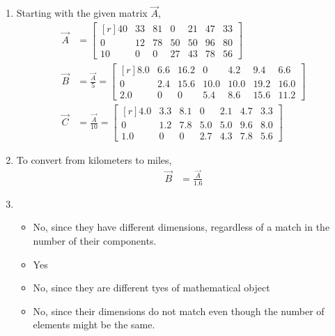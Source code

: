\begin{enumerate}
    \item Starting with the given matrix $ \vec{A} $,
          \begin{align}
              \vec{A} & =
              \begin{bmatrix*}[r]
                  40 & 33 & 81 & 0  & 21 & 47 & 33 \\
                  0  & 12 & 78 & 50 & 50 & 96 & 80 \\
                  10 & 0  & 0  & 27 & 43 & 78 & 56
              \end{bmatrix*}             \\
              \vec{B} & = \frac{\vec{A}}{5} =
              \begin{bmatrix*}[r]
                  8.0 & 6.6 & 16.2 & 0    & 4.2  & 9.4  & 6.6  \\
                  0   & 2.4 & 15.6 & 10.0 & 10.0 & 19.2 & 16.0 \\
                  2.0 & 0   & 0    & 5.4  & 8.6  & 15.6 & 11.2
              \end{bmatrix*} \\
              \vec{C} & = \frac{\vec{A}}{10} =
              \begin{bmatrix*}[r]
                  4.0 & 3.3 & 8.1 & 0   & 2.1 & 4.7 & 3.3 \\
                  0   & 1.2 & 7.8 & 5.0 & 5.0 & 9.6 & 8.0 \\
                  1.0 & 0   & 0   & 2.7 & 4.3 & 7.8 & 5.6
              \end{bmatrix*}
          \end{align}

    \item To convert from kilometers to miles,
          \begin{align}
              \vec{B} & = \frac{\vec{A}}{1.6}
          \end{align}

    \item \begin{itemize}
              \item No, since they have different dimensions, regardless of a match in the
                    number of their components.
              \item Yes
              \item No, since they are different tyes of mathematical object
              \item No, since their dimensions do not match even though the number of
                    elements might be the same.
          \end{itemize}


\end{enumerate}
